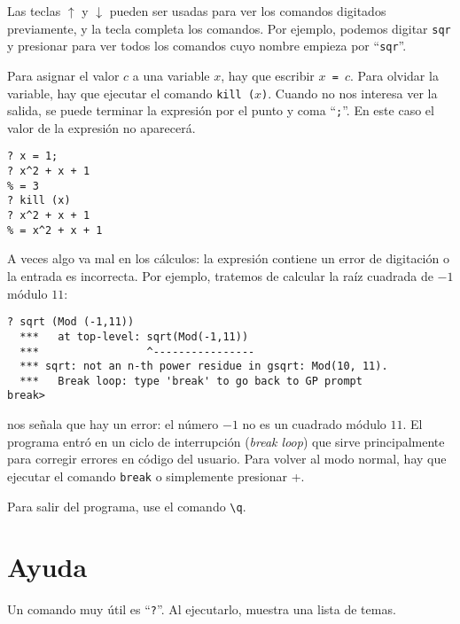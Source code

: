 Las teclas $\boxed{\uparrow}$ y $\boxed{\downarrow}$ pueden ser usadas para ver
los comandos digitados previamente, y la tecla  completa los
comandos. Por ejemplo, podemos digitar \texttt{sqr} y presionar
 para ver todos los comandos cuyo nombre empieza por
``\texttt{sqr}''.

Para asignar el valor $c$ a una variable $x$, hay que escribir
\texttt{$x$ = $c$}. Para olvidar la variable, hay que ejecutar el comando
\texttt{kill\,($x$)}. Cuando no nos interesa ver la salida, se puede terminar
la expresión por el punto y coma ``\texttt{;}''. En este caso el valor de
la expresión no aparecerá.

\begin{framed}\footnotesize
\begin{verbatim}
? x = 1;
? x^2 + x + 1
% = 3
? kill (x)
? x^2 + x + 1
% = x^2 + x + 1
\end{verbatim}
\end{framed}

A veces algo va mal en los cálculos: la expresión contiene un error de
digitación o la entrada es incorrecta. Por ejemplo, tratemos de calcular la raíz
cuadrada de $-1$ módulo $11$:

\begin{framed}\footnotesize
\begin{verbatim}
? sqrt (Mod (-1,11))
  ***   at top-level: sqrt(Mod(-1,11))
  ***                 ^----------------
  *** sqrt: not an n-th power residue in gsqrt: Mod(10, 11).
  ***   Break loop: type 'break' to go back to GP prompt
break> 
\end{verbatim}
\end{framed}

\gp{} nos señala que hay un error: el número $-1$ no es un cuadrado módulo
$11$. El programa entró en un ciclo de interrupción (\emph{break loop}) que
sirve principalmente para corregir errores en código del usuario. Para volver
al modo normal, hay que ejecutar el comando \texttt{break} o simplemente
presionar +.

Para salir del programa, use el comando \texttt{\textbackslash q}.


\section{Ayuda}

Un comando muy útil es ``\texttt{?}''. Al ejecutarlo, \gp{} muestra una lista de
temas.

